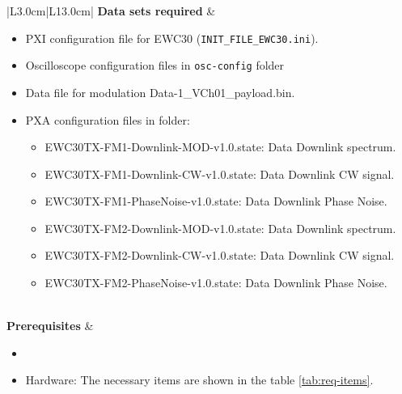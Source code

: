 \begin{table}[H]
\begin{tabular}{|L{3.0cm}|L{13.0cm}|}
		\textbf{Data sets required} & 
		\begin{minipage}[t]{\linewidth}
		   \begin{itemize}[nosep,after=\strut]
			   \item \comEgse{}{} PXI configuration file for EWC30 (\texttt{INIT\_FILE\_EWC30.ini}).
			   \item Oscilloscope configuration files in \texttt{osc-config} folder
			   \item Data file for modulation Data-1\_VCh01\_payload.bin.
			   \item PXA configuration files in \texttt{\pxaTestFolderName} folder:
					 \begin{itemize}[nosep,after=\strut]
						\item EWC30TX-FM1-Downlink-MOD-v1.0.state: Data Downlink spectrum.%
						\item EWC30TX-FM1-Downlink-CW-v1.0.state: Data Downlink CW signal.%
						\item EWC30TX-FM1-PhaseNoise-v1.0.state: Data Downlink Phase Noise.%
						\item EWC30TX-FM2-Downlink-MOD-v1.0.state: Data Downlink spectrum.%
						\item EWC30TX-FM2-Downlink-CW-v1.0.state: Data Downlink CW signal.%
						\item EWC30TX-FM2-PhaseNoise-v1.0.state: Data Downlink Phase Noise.%
					 \end{itemize}
		   \end{itemize}
	   \end{minipage}\\\hline
	   \textbf{Prerequisites} & 
	   \begin{minipage}[t]{\linewidth}
		   \begin{itemize}[nosep,after=\strut]
			\item \preReqPro
			   \item Hardware: The necessary items are shown in the table \ref{tab:req-items}.
		   \end{itemize} 
	   \end{minipage}\\\hline
   \end{tabular}
	   \caption{Procedure \subprocid{} \ description. } \label{tb:datastability}
	   \end{table}

